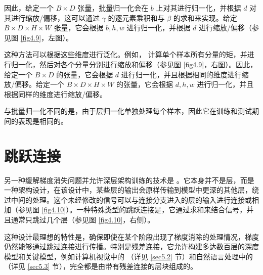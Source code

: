 因此，给定一个 $B \times D$ 张量，批量归一化会在 $b$ 上对其进行归一化，并根据 $d$ 对其进行缩放/偏移，这可以通过 $\gamma$ 的逐元素乘积和与 $\beta$ 的求和来实现。给定 $B \times D \times H \times W$ 张量，它会根据 $b,h,w$ 进行归一化，并根据 $d$ 进行缩放/偏移（参见图 \ref{fig4.9}，左图）。

这种方法可以根据这些维度进行泛化。例如， \citep{arxiv-1607.06450} 计算单个样本所有分量的矩，并进行归一化，然后对各个分量分别进行缩放和偏移（参见图 \ref{fig4.9}，右图）。因此，给定一个 $B \times D$ 的张量，它会根据 $d$ 进行归一化，并且根据相同的维度进行缩放/偏移。给定一个 $B \times D \times H \times W$ 的张量，它会根据 $d,h,w$ 进行归一化，并且根据同样的维度进行缩放/偏移。

\newpage

与批量归一化不同的是，由于层归一化单独处理每个样本，因此它在训练和测试期间的表现是相同的。

\section{跳跃连接}\label{sec4.7}

另一种缓解梯度消失问题并允许深层架构训练的技术是 \citep{arxiv-1411.4038, arxiv-1505.04597}。它本身并不是层，而是一种架构设计，在该设计中，某些层的输出会原样传输到模型中更深的其他层，绕过中间的处理。这个未经修改的信号可以与连接分支进入的层的输入进行连接或相加（参见图 \ref{fig4.10}）。一种特殊类型的跳跃连接是，它通过求和来结合信号，并且通常只跳过几个层（参见图 \ref{fig4.10}，右侧）。

这种设计最理想的特性是，确保即使在某个阶段出现了梯度消除的处理情况，梯度仍然能够通过跳过连接进行传播。特别是残差连接，它允许构建多达数百层的深度模型和关键模型，例如计算机视觉中的 \citep{arxiv-1512.03385}（详见 \ref{sec5.2} 节）和自然语言处理中的  \citep{arxiv-1706.03762}（详见 \ref{sec5.3} 节），完全都是由带有残差连接的层块组成的。

\newpage

